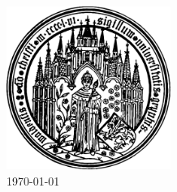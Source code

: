 \documentclass[
10pt, %
twoside, %
chapterinoneline,%
onehalfspacing, %
nolistspacing, %
parskip, %
headsepline, %
english,
]{MastersDoctoralThesis} %
\begin{document}
\begin{titlepage}
\begin{center}
		\includegraphics[width=0.4\textwidth]{images/logo.pdf}\\[1cm] %
		{\large \today} %

		\vfill
		
	\end{center}
	
\end{titlepage}



%
%


%	
%	
%	


%
%	
%	


\tableofcontents %

\end{document}
